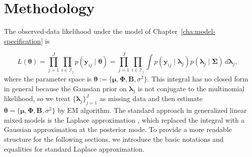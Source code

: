 \chapter{Methodology}
\label{cha:methodology}

The observed-data likelihood under the model of Chapter~\ref{cha:model-specification} is

\begin{equation}
    L(\bm{\theta})=\prod_{j=1}^{J}\prod_{i\in \mathcal{I}_{j}} p(\bm{y}_{ij}\mid \bm{\theta})=\prod_{j=1}^{J}\prod_{i\in \mathcal{I}_{j}} \int p(\bm{y}_{ij}\mid \bm{\lambda}_{j})p(\bm{\lambda}_{j}\mid \bm{\Sigma})\,d\bm{\lambda}_{j},
    \label{eq:log-lik-chap2}
\end{equation}
where the parameter space is $\bm{\theta}:=\{\bm{\mu}, \bm{\Phi}, \mathbf{B},\sigma^{2}\}$. This integral has no closed form in general because the Gaussian prior on $\bm{\lambda}_{j}$ is not conjugate to the multinomial likelihood, so we treat $\{\bm{\lambda}_{j}\}_{j=1}^{J}$ as missing data and then estimate $\bm{\theta}=\{\bm{\mu}, \bm{\Phi}, \mathbf{B},\sigma^{2}\}$ by EM algorithm. The standard approach in generalized linear mixed models is the Laplace approximation \citep{Breslow1993,Tierney1986}, which replaced the integral with a Gaussian approximation at the posterior mode.
To provide a more readable structure for the following sections, we introduce the basic notations and equalities for standard Laplace approximation.


